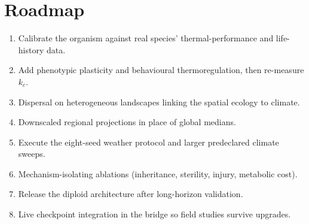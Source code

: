 \section{Roadmap}
\begin{enumerate}[leftmargin=*]
\item Calibrate the organism against real species' thermal-performance and
life-history data.
\item Add phenotypic plasticity and behavioural thermoregulation, then re-measure $k_c$.
\item Dispersal on heterogeneous landscapes linking the spatial ecology to climate.
\item Downscaled regional projections in place of global medians.
\item Execute the eight-seed weather protocol and larger predeclared climate sweeps.
\item Mechanism-isolating ablations (inheritance, sterility, injury, metabolic cost).
\item Release the diploid architecture after long-horizon validation.
\item Live checkpoint integration in the bridge so field studies survive upgrades.
\end{enumerate}

